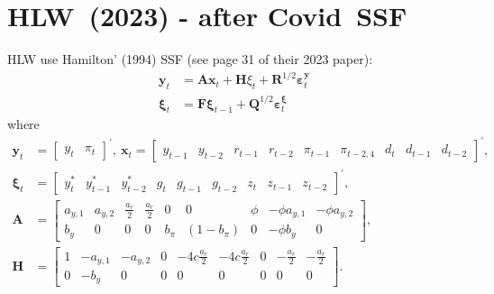 \documentclass[12pt,a4paper]{article}
\newcommand{\bls}{\begin{landscape}}   \newcommand{\els}{\end{landscape}}
\begin{document}


\section{HLW\ (2023) - after Covid\ SSF}

HLW use Hamilton' (1994) SSF (see page 31 of their 2023 paper):%
\begin{align*}
\mathbf{y}_{t}& =\mathbf{Ax}_{t}+\mathbf{H}\xi _{t}+\boldsymbol{R}^{1/2}%
\boldsymbol{\varepsilon }_{t}^{\mathbf{y}} \\
\boldsymbol{\xi }_{t}& =\mathbf{F}\boldsymbol{\xi }_{t-1}+\boldsymbol{Q}%
^{1/2}\boldsymbol{\varepsilon }_{t}^{\boldsymbol{\xi }}
\end{align*}%
where%
\begin{align*}
\mathbf{y}_{t}& =%
\begin{bmatrix}
y_{t} & \pi _{t}%
\end{bmatrix}%
^{\prime },~\mathbf{x}_{t}=%
\begin{bmatrix}
y_{t-1} & y_{t-2} & r_{t-1} & r_{t-2} & \pi _{t-1} & \pi _{t-2,4} & d_{t} & 
d_{t-1} & d_{t-2}%
\end{bmatrix}%
^{\prime }, \\
\boldsymbol{\xi }_{t}& =%
\begin{bmatrix}
y_{t}^{\ast } & y_{t-1}^{\ast } & y_{t-2}^{\ast } & g_{t} & g_{t-1} & g_{t-2}
& z_{t} & z_{t-1} & z_{t-2}%
\end{bmatrix}%
^{\prime }, \\
\mathbf{A}& =%
\begin{bmatrix}
a_{y,1} & a_{y,2} & \frac{a_{r}}{2} & \frac{a_{r}}{2} & 0 & 0 & \phi  & 
-\phi a_{y,1} & -\phi a_{y,2} \\ 
b_{y} & 0 & 0 & 0 & b_{\pi } & (1-b_{\pi }) & 0 & -\phi b_{y} & 0%
\end{bmatrix}%
, \\
\mathbf{H}& =%
\begin{bmatrix}
1 & -a_{y,1} & -a_{y,2} & 0 & -4c\frac{a_{r}}{2} & -4c\frac{a_{r}}{2} & 0 & -%
\frac{a_{r}}{2} & -\frac{a_{r}}{2} \\ 
0 & -b_{y} & 0 & 0 & 0 & 0 & 0 & 0 & 0%
\end{bmatrix}%
.
\end{align*}%
\end{document}
